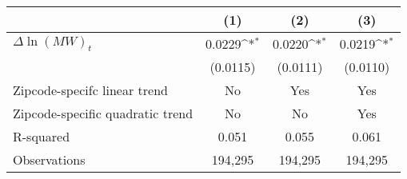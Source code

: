 {
\def\sym#1{\ifmmode^{#1}\else\(^{#1}\)\fi}
\begin{tabular}{l*{3}{c}}
\hline\hline
          &\multicolumn{1}{c}{(1)}         &\multicolumn{1}{c}{(2)}         &\multicolumn{1}{c}{(3)}         \\
\hline
$\Delta \ln(MW)_{t}$&   0.0229\sym{*}  &   0.0220\sym{*}  &   0.0219\sym{*}  \\
          & (0.0115)         & (0.0111)         & (0.0110)         \\
\hline
Zipcode-specifc linear trend&       No         &      Yes         &      Yes         \\
Zipcode-specific quadratic trend&       No         &       No         &      Yes         \\
R-squared &    0.051         &    0.055         &    0.061         \\
Observations&  194,295         &  194,295         &  194,295         \\
\hline\hline
\end{tabular}
}
